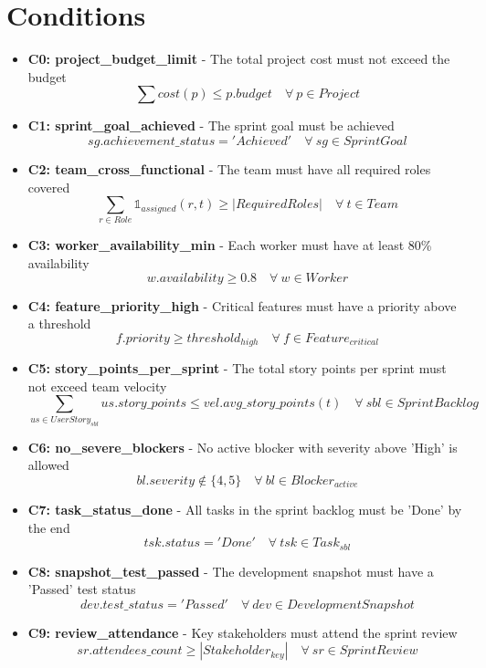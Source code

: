 \documentclass{article}
\begin{document}
\section{Conditions}
\begin{itemize}
    \item \textbf{C0: project\_budget\_limit} - The total project cost must not exceed the budget
          \[ \sum cost(p) \leq p.budget \quad \forall\ p \in Project \]
    \item \textbf{C1: sprint\_goal\_achieved} - The sprint goal must be achieved
          \[ sg.achievement\_status = 'Achieved' \quad \forall\ sg \in SprintGoal \]
    \item \textbf{C2: team\_cross\_functional} - The team must have all required roles covered
          \[ \sum_{r \in Role} \mathbb{1}_{assigned}(r, t) \geq |RequiredRoles| \quad \forall\ t \in Team \]
    \item \textbf{C3: worker\_availability\_min} - Each worker must have at least 80\% availability
          \[ w.availability \geq 0.8 \quad \forall\ w \in Worker \]
    \item \textbf{C4: feature\_priority\_high} - Critical features must have a priority above a threshold
          \[ f.priority \geq threshold_{high} \quad \forall\ f \in Feature_{critical} \]
    \item \textbf{C5: story\_points\_per\_sprint} - The total story points per sprint must not exceed team velocity
          \[ \sum_{us \in UserStory_{sbl}} us.story\_points \leq vel.avg\_story\_points(t) \quad \forall\ sbl \in SprintBacklog \]
    \item \textbf{C6: no\_severe\_blockers} - No active blocker with severity above 'High' is allowed
          \[ bl.severity \notin \{4, 5\} \quad \forall\ bl \in Blocker_{active} \]
    \item \textbf{C7: task\_status\_done} - All tasks in the sprint backlog must be 'Done' by the end
          \[ tsk.status = 'Done' \quad \forall\ tsk \in Task_{sbl} \]
    \item \textbf{C8: snapshot\_test\_passed} - The development snapshot must have a 'Passed' test status
          \[ dev.test\_status = 'Passed' \quad \forall\ dev \in DevelopmentSnapshot \]
    \item \textbf{C9: review\_attendance} - Key stakeholders must attend the sprint review
          \[ sr.attendees\_count \geq |Stakeholder_{key}| \quad \forall\ sr \in SprintReview \]
\end{itemize}
\end{document}
